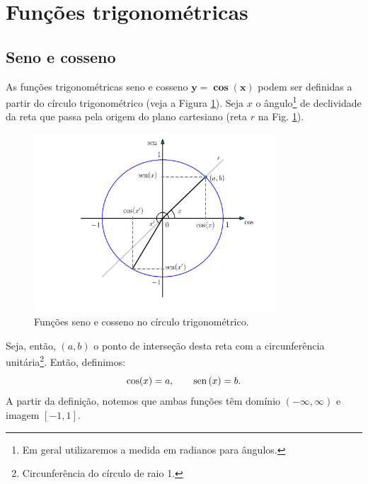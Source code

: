 \documentclass[../main.tex]{subfiles}
\begin{document}
\section{Funções trigonométricas}\label{sec:FuncTrigonometricas}
\subsection{Seno e cosseno}\label{subsec:Trig_Seno-cosseno}
As funções trigonométricas seno  e cosseno $\boldsymbol{y=\cos(x)}$ podem ser definidas a partir do círculo trigonométrico (veja a Figura \ref{fig:cos_seno}). Seja $x$ o ângulo\footnote{Em geral utilizaremos a medida em radianos para ângulos.} de declividade da reta que passa pela origem do plano cartesiano (reta $r$ na Fig. \ref{fig:cos_seno}). 
\begin{figure}[H]
  \centering
  \includegraphics[width=0.8\textwidth]{fig_func/fig_cos_seno}
    \caption{Funções seno e cosseno no círculo trigonométrico.}
  \label{fig:cos_seno}
\end{figure}
Seja, então, $(a,b)$ o ponto de interseção desta reta com a circunferência unitária\footnote{Circunferência do círculo de raio 1.}. Então, definimos:
\begin{equation}
  \cos(x) = a,\qquad \operatorname{sen}\,(x) = b.
\end{equation}
A partir da definição, notemos que ambas funções têm domínio $(-\infty, \infty)$ e imagem $[-1, 1]$.
\end{document}
